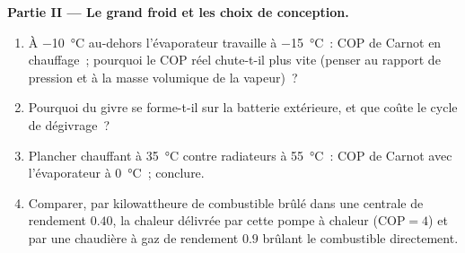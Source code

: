 \begin{problem}
\textbf{Partie II --- Le grand froid et les choix de conception.}
\begin{enumerate}[resume]
  \item À \qty{-10}{\celsius} au-dehors l'évaporateur travaille à
        \qty{-15}{\celsius}~: COP de Carnot en chauffage~; pourquoi le COP réel
        chute-t-il plus vite (penser au rapport de pression et à la
        masse volumique de la vapeur)~?
  \item Pourquoi du givre se forme-t-il sur la batterie extérieure, et que coûte le
        cycle de dégivrage~?
  \item Plancher chauffant à \qty{35}{\celsius} contre radiateurs à
        \qty{55}{\celsius}~: COP de Carnot avec l'évaporateur à
        \qty{0}{\celsius}~; conclure.
  \item Comparer, par kilowattheure de combustible brûlé dans une centrale de
        rendement $0.40$, la chaleur délivrée par cette pompe à chaleur ($\mathrm{COP}
        = 4$) et par une chaudière à gaz de rendement $0.9$ brûlant le combustible
        directement.
\end{enumerate}


\end{problem}
